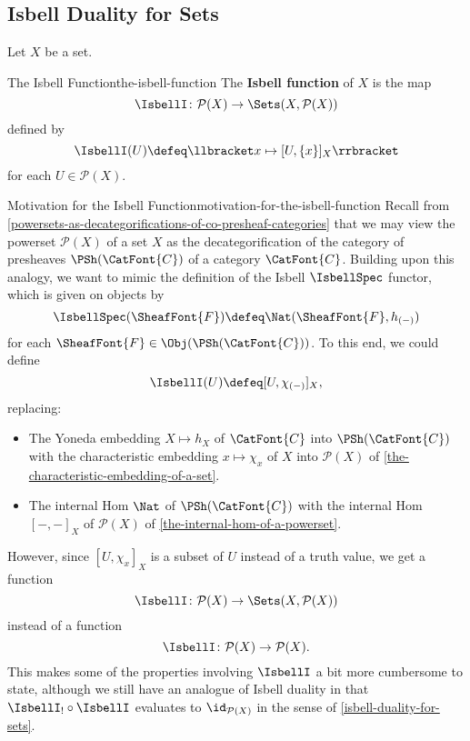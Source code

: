 \subsection{Isbell Duality for Sets}\label{subsection-isbell-duality-for-sets}
Let $X$ be a set.
\begin{definition}{The Isbell Function}{the-isbell-function}%
    The \textbf{Isbell function} of $X$ is the map%
    \[
        \IsbellI%
        \colon%
        \mathcal{P}(X)%
        \to%
        \Sets(X,\mathcal{P}(X))%
    \]%
    defined by
    \[
        \IsbellI(U)%
        \defeq%
        \llbracket x\mapsto[U,\{x\}]_{X}\rrbracket%
    \]%
    for each $U\in\mathcal{P}(X)$.
\end{definition}
\begin{remark}{Motivation for the Isbell Function}{motivation-for-the-isbell-function}%
    Recall from \cref{powersets-as-decategorifications-of-co-presheaf-categories} that we may view the powerset $\mathcal{P}(X)$ of a set $X$ as the decategorification of the category of presheaves $\PSh(\CatFont{C})$ of a category $\CatFont{C}$. Building upon this analogy, we want to mimic the definition of the Isbell $\IsbellSpec$ functor, which is given on objects by
    \[
        \IsbellSpec(\SheafFont{F})%
        \defeq%
        \Nat(\SheafFont{F},h_{(-)})%
    \]%
    for each $\SheafFont{F}\in\Obj(\PSh(\CatFont{C}))$. To this end, we could define
    \[
        \IsbellI(U)%
        \defeq%
        [U,\chi_{(-)}]_{X},%
    \]%
    replacing:
    \begin{itemize}
        \item The Yoneda embedding $X\mapsto h_{X}$ of $\CatFont{C}$ into $\PSh(\CatFont{C})$ with the characteristic embedding $x\mapsto\chi_{x}$ of $X$ into $\mathcal{P}(X)$ of \cref{the-characteristic-embedding-of-a-set}.
        \item The internal Hom $\Nat$ of $\PSh(\CatFont{C})$ with the internal Hom $[-,-]_{X}$ of $\mathcal{P}(X)$ of \cref{the-internal-hom-of-a-powerset}.
    \end{itemize}
    However, since $[U,\chi_{x}]_{X}$ is a subset of $U$ instead of a truth value, we get a function
    \[
        \IsbellI%
        \colon%
        \mathcal{P}(X)%
        \to%
        \Sets(X,\mathcal{P}(X))%
    \]%
    instead of a function
    \[
        \IsbellI%
        \colon%
        \mathcal{P}(X)%
        \to%
        \mathcal{P}(X).%
    \]%
    This makes some of the properties involving $\IsbellI$ a bit more cumbersome to state, although we still have an analogue of Isbell duality in that $\IsbellI_{!}\circ\IsbellI$ evaluates to $\id_{\mathcal{P}(X)}$ in the sense of \cref{isbell-duality-for-sets}.
\end{remark}

